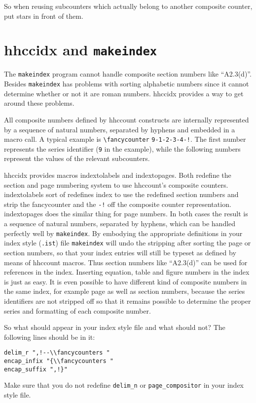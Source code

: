 \documentclass[11pt]{article}
\makeatletter
\def\packagename#1{{\sffamily #1}}     %
\def\macroname#1{{\ttfamily\@ttbs#1}}  %
\def\hhccount{\packagename{hhccount}\xspace}
\def\hhccidx{\packagename{hhccidx}\xspace}
\def\={\verb=}
\def\<#1>{\macroname{#1}}
\makeatother
\begin{document}
So when reusing subcounters which actually belong to another
composite counter, put stars in front of them.

\section{\hhccidx and \texttt{makeindex}}

The {\tt makeindex} program cannot handle composite section numbers
like ``A2.3(d)''. Besides {\tt makeindex} has problems
with sorting alphabetic numbers since it cannot determine whether
or not it are roman numbers. \hhccidx provides a way to get around
these problems.

All composite numbers defined by \hhccount constructs
are internally represented by a sequence of natural numbers, separated
by hyphens and embedded in a macro call. A typical example is
\=\fancycounter= \=9-1-2-3-4-!=. The first number represents the
series identifier (\=9= in the example), while the following
numbers represent the values of the relevant subcounters.

\hhccidx provides macros \<indextolabels> and
\<indextopages>. Both redefine the section and page numbering
system to use \hhccount's composite counters. \<indextolabels> sort of
redefines \<index> to use the redefined section numbers and strip the
\<fancycounter> and the \=-!= off the composite counter representation.
\<indextopages> does the similar thing for page numbers.
In both cases the result is a sequence of natural numbers,
separated by hyphens, which can be handled perfectly well by
{\tt makeindex}.
By embodying the appropriate definitions in your index style
(\hbox{\tt .ist}) file {\tt makeindex} will undo the stripping after
sorting the page or section numbers, so that your index entries will
still be typeset as defined by means of \hhccount macros. Thus section
numbers like ``A2.3(d)'' can be used for references in the index.
Inserting equation, table and figure numbers in the index is just as
easy. It is
even possible to have different kind of composite numbers in the
same index, for example page as well as section numbers, because
the series identifiers are not stripped off so that it remains possible
to determine the proper series and formatting of each composite number.

So what should appear in your index style file and what should not?
The following lines should be in it:
\begin{verbatim}
delim_r ",!--\\fancycounters "
encap_infix "{\\fancycounters "
encap_suffix ",!}"
\end{verbatim}
Make sure that you do not redefine \=delim_n= or
\=page_compositor= in your index style file.
\end{document}

